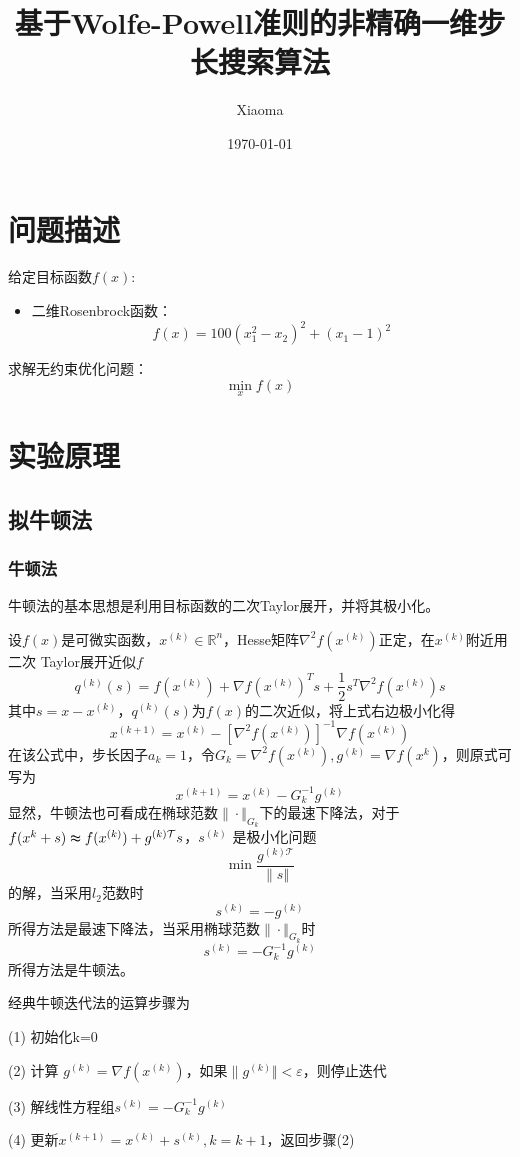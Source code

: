\documentclass[12pt, a4paper, oneside]{ctexart}
\title{基于Wolfe-Powell准则的非精确一维步长搜索算法}
\author{Xiaoma}
\date{\today}
\begin{document}
\maketitle
\section*{问题描述}
给定目标函数$f(x)$:
\begin{itemize}
    \item 二维Rosenbrock函数：
    $$f(x) = 100(x_{1}^{2}-x_{2})^{2}+(x_{1} - 1)^{2}$$
    

\end{itemize}
求解无约束优化问题：
$$\min_{x} f(x)$$

\section*{实验原理}
\subsection*{拟牛顿法}
\subsubsection*{牛顿法}
牛顿法的基本思想是利用目标函数的二次Taylor展开，并将其极小化。

设$f(x)$是可微实函数，$x^{(k)} \in \mathbb{R}^{n}$，Hesse矩阵$\nabla^{2}f(x^{(k)})$正定，在$x^{(k)}$附近用二次
Taylor展开近似$f$
$$q^{(k)}(s) = f(x^{(k)}) + \nabla f(x^{(k)})^{T}s + \frac{1}{2} s^{T}\nabla^{2}f(x^{(k)})s$$
其中$s=x-x^{(k)}$，$q^{(k)}(s)$为$f(x)$的二次近似，将上式右边极小化得
$$x^{(k + 1)} = x^{(k)} - [\nabla^{2}f(x^{(k)})]^{-1}\nabla f(x^{(k)})$$
在该公式中，步长因子$a_{k}=1$，令$G_{k} = \nabla^{2}f(x^{(k)}),g^{(k)} = \nabla f(x^{k})$，则原式可写为
$$x^{(k + 1)} = x^{(k)} - G_{k}^{-1}g^{(k)}$$
显然，牛顿法也可看成在椭球范数$\| \cdot \Vert_{G_{k}} $下的最速下降法，对于$f(x^{k} + s) \thickapprox  f(x^{(k)}) + g^{(k)\mathcal{T}}s$，$s^{(k)}$
是极小化问题
$$\min \frac{g^{(k)\mathcal{T}}}{\| s\Vert}$$
的解，当采用$l_{2}$范数时
$$s^{(k)} = -g^{(k)}$$
所得方法是最速下降法，当采用椭球范数$\| \cdot \Vert_{G_{k}} $时
$$s^{(k)} = -G_{k}^{-1}g^{(k)}$$
所得方法是牛顿法。

经典牛顿迭代法的运算步骤为
\begin{algorithm*}
    \caption{}
    \label{alg:algorithm}
    \BlankLine
    (1) 初始化k=0

    (2) 计算 $g^{(k)} = \nabla f(x^{(k)})$，如果$\| g^{(k)}\Vert <\varepsilon $，则停止迭代

    (3) 解线性方程组$s^{(k)} = -G_{k}^{-1}g^{(k)}$

    (4) 更新$x^{(k+1)} = x^{(k)} + s^{(k)},k = k + 1$，返回步骤(2)
\end{algorithm*}
\end{document}
